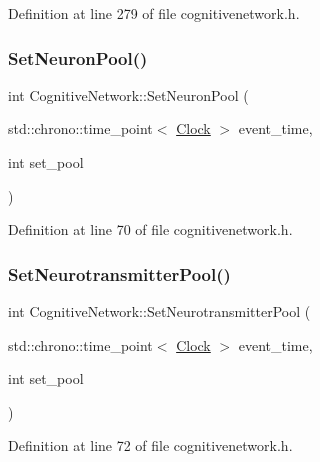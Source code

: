 Definition at line 279 of file cognitivenetwork.\+h.

\mbox{\label{class_cognitive_network_aeb59b511e2ef526c43df1d24a468b571}} 
\subsubsection{\texorpdfstring{Set\+Neuron\+Pool()}{SetNeuronPool()}}
{\footnotesize\ttfamily int Cognitive\+Network\+::\+Set\+Neuron\+Pool (\begin{DoxyParamCaption}\item[{std\+::chrono\+::time\+\_\+point$<$ \hyperlink{universe_8h_a0ef8d951d1ca5ab3cfaf7ab4c7a6fd80}{Clock} $>$}]{event\+\_\+time,  }\item[{int}]{set\+\_\+pool }\end{DoxyParamCaption})\hspace{0.3cm}{\ttfamily [inline]}}



Definition at line 70 of file cognitivenetwork.\+h.

\mbox{\label{class_cognitive_network_aaa10c36c0b0024fa717d8d61a4a06920}} 
\subsubsection{\texorpdfstring{Set\+Neurotransmitter\+Pool()}{SetNeurotransmitterPool()}}
{\footnotesize\ttfamily int Cognitive\+Network\+::\+Set\+Neurotransmitter\+Pool (\begin{DoxyParamCaption}\item[{std\+::chrono\+::time\+\_\+point$<$ \hyperlink{universe_8h_a0ef8d951d1ca5ab3cfaf7ab4c7a6fd80}{Clock} $>$}]{event\+\_\+time,  }\item[{int}]{set\+\_\+pool }\end{DoxyParamCaption})\hspace{0.3cm}{\ttfamily [inline]}}



Definition at line 72 of file cognitivenetwork.\+h.

